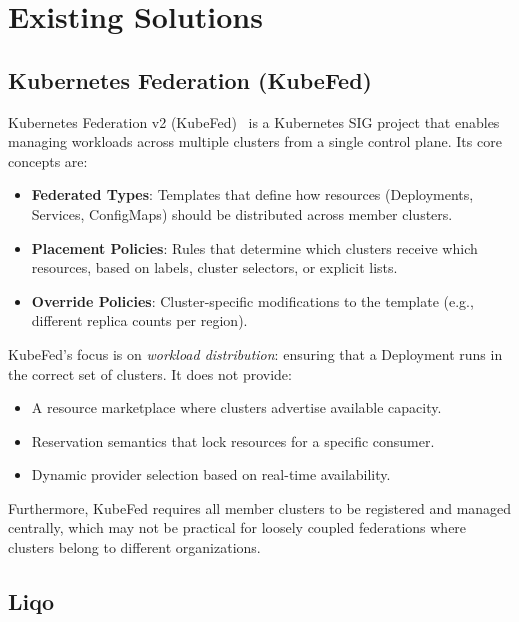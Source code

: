 \section{Existing Solutions}
\label{sec:existing-solutions}

\subsection{Kubernetes Federation (KubeFed)}
\label{subsec:federation}

Kubernetes Federation v2 (KubeFed)~\cite{kubefed} is a Kubernetes SIG project that enables managing workloads across multiple clusters from a single control plane. Its core concepts are:

\begin{itemize}
    \item \textbf{Federated Types}: Templates that define how resources (Deployments, Services, ConfigMaps) should be distributed across member clusters.
    \item \textbf{Placement Policies}: Rules that determine which clusters receive which resources, based on labels, cluster selectors, or explicit lists.
    \item \textbf{Override Policies}: Cluster-specific modifications to the template (e.g., different replica counts per region).
\end{itemize}

KubeFed's focus is on \textit{workload distribution}: ensuring that a Deployment runs in the correct set of clusters. It does not provide:
\begin{itemize}
    \item A resource marketplace where clusters advertise available capacity.
    \item Reservation semantics that lock resources for a specific consumer.
    \item Dynamic provider selection based on real-time availability.
\end{itemize}

Furthermore, KubeFed requires all member clusters to be registered and managed centrally, which may not be practical for loosely coupled federations where clusters belong to different organizations.

\subsection{Liqo}
\label{subsec:liqo}


